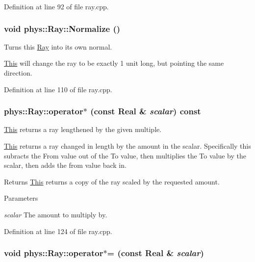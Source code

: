 Definition at line 92 of file ray.cpp.

\hypertarget{classphys_1_1Ray_a2acbaef60718001a048db26ccaaef787}{
\subsubsection[{Normalize}]{\setlength{\rightskip}{0pt plus 5cm}void phys::Ray::Normalize ()}}
\label{df/d57/classphys_1_1Ray_a2acbaef60718001a048db26ccaaef787}


Turns this \hyperlink{classphys_1_1Ray}{Ray} into its own normal. 

\hyperlink{structThis}{This} will change the ray to be exactly 1 unit long, but pointing the same direction. 

Definition at line 110 of file ray.cpp.

\hypertarget{classphys_1_1Ray_a6a47611776a9ab83d7ebc178a8d35b50}{
\subsubsection[{operator$\ast$}]{ phys::Ray::operator$\ast$ (const {\bf Real} \& {\em scalar}) const}}
\label{df/d57/classphys_1_1Ray_a6a47611776a9ab83d7ebc178a8d35b50}


\hyperlink{structThis}{This} returns a ray lengthened by the given multiple. 

\hyperlink{structThis}{This} returns a ray changed in length by the amount in the scalar. Specifically this subracts the From value out of the To value, then multiplies the To value by the scalar, then adds the from value back in. \begin{DoxyReturn}{Returns}
\hyperlink{structThis}{This} returns a copy of the ray scaled by the requested amount. 
\end{DoxyReturn}

\begin{DoxyParams}{Parameters}
\item[{\em scalar}]The amount to multiply by. \end{DoxyParams}


Definition at line 124 of file ray.cpp.

\hypertarget{classphys_1_1Ray_acc1ac010f02f61b3d5234a5b619e926a}{
\subsubsection[{operator$\ast$=}]{\setlength{\rightskip}{0pt plus 5cm}void phys::Ray::operator$\ast$= (const {\bf Real} \& {\em scalar})}}
\label{df/d57/classphys_1_1Ray_acc1ac010f02f61b3d5234a5b619e926a}


